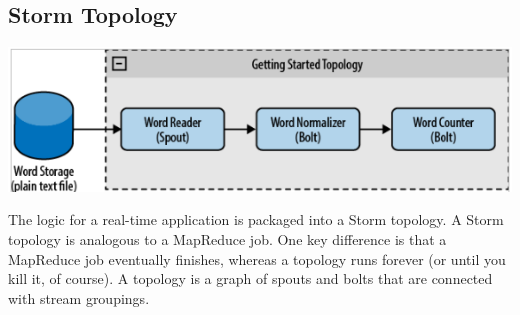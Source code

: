 \subsection{Storm Topology}
\begin{center}
\includegraphics[scale=.5]{../img/img2} \\[2mm]
\end{center}
The logic for a real-time application is packaged into a Storm topology. A Storm topology is analogous to a MapReduce job. One key difference is that a MapReduce job eventually finishes, whereas a topology runs forever (or until you kill it, of course). A topology is a graph of spouts and bolts that are connected with stream groupings.
